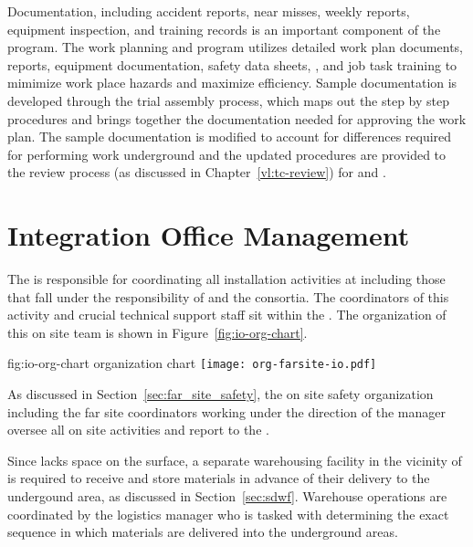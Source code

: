 Documentation, including accident reports, near misses, weekly
reports, equipment inspection, and training records is an important
component of the   program. The work
planning and  program utilizes detailed work plan documents,
 reports, equipment documentation, safety data sheets,
, and job task training to mimimize work place hazards and
maximize efficiency.  Sample documentation is developed through the
 trial assembly process, which maps out the step by
step procedures and brings together the documentation needed for
approving the work plan.  The sample documentation is modified to
account for differences required for performing work underground and
the updated procedures are provided to the review process (as
discussed in Chapter~\ref{vl:tc-review}) for  and
.

\section{Integration Office Management}
\label{vl:tc-facility_mgmt}

The  is responsible for coordinating all installation
activities at  including those that fall under the %
responsibility of  and the  consortia.  
The coordinators of this activity and crucial technical support
staff sit within the .  The organization of this on site team is 
shown in Figure~\ref{fig:io-org-chart}.
\begin{dunefigure}{fig:io-org-chart}
  { organization chart}
  \texttt{[image: org-farsite-io.pdf]}
\end{dunefigure}
 
As discussed in Section~\ref{sec:far_site_safety}, the on site safety
organization including the far site  coordinators
working under the direction of the  
manager oversee all on site activities and report 
to the .

Since  lacks space on the surface, a separate
warehousing facility in the vicinity of  is required to
receive and store materials in advance of their delivery to the
undergound area, as discussed in Section~\ref{sec:sdwf}.  Warehouse
operations are coordinated by the  logistics manager
who is tasked with determining the exact sequence in which materials
are delivered into the underground areas.

